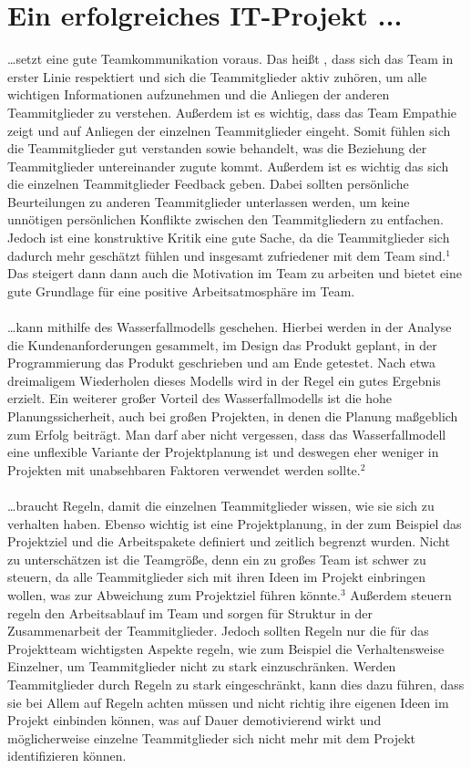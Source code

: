 \documentclass[12pt]{scrartcl}
\begin{document}
\section*{Ein erfolgreiches IT-Projekt ...}
\onehalfspacing
…setzt eine gute Teamkommunikation  voraus. Das heißt , dass sich das Team in erster Linie respektiert und sich die Teammitglieder aktiv zuhören, um alle wichtigen Informationen aufzunehmen und die Anliegen der anderen Teammitglieder zu verstehen. Außerdem ist es wichtig, dass das Team Empathie zeigt und auf Anliegen der einzelnen Teammitglieder eingeht. Somit fühlen sich die Teammitglieder gut verstanden sowie behandelt, was die Beziehung der Teammitglieder untereinander zugute kommt. Außerdem ist es wichtig das sich die einzelnen Teammitglieder Feedback geben. Dabei sollten persönliche Beurteilungen zu anderen Teammitglieder unterlassen werden, um keine unnötigen persönlichen Konflikte zwischen den Teammitgliedern zu entfachen. Jedoch ist eine konstruktive Kritik eine gute Sache, da die Teammitglieder sich dadurch mehr geschätzt fühlen und insgesamt zufriedener mit dem Team sind.$^1$ Das steigert dann dann auch die Motivation im Team zu arbeiten und bietet eine gute Grundlage für eine positive Arbeitsatmosphäre im Team.
	\\ \\
	…kann mithilfe des Wasserfallmodells geschehen. Hierbei werden in der Analyse die Kundenanforderungen gesammelt, im Design das Produkt geplant, in der Programmierung das Produkt geschrieben und am Ende getestet. Nach etwa dreimaligem Wiederholen dieses Modells wird in der Regel ein gutes Ergebnis erzielt. Ein weiterer großer Vorteil des Wasserfallmodells ist die hohe Planungssicherheit, auch bei großen Projekten, in denen die Planung maßgeblich zum Erfolg beiträgt. Man darf aber nicht vergessen, dass das Wasserfallmodell eine unflexible Variante der Projektplanung ist und deswegen eher weniger in Projekten mit unabsehbaren Faktoren verwendet werden sollte.$^2$
	\\ \\
	…braucht Regeln, damit die einzelnen Teammitglieder wissen, wie sie sich zu verhalten haben. Ebenso wichtig ist eine Projektplanung, in der zum Beispiel das Projektziel und die Arbeitspakete definiert und zeitlich begrenzt wurden. Nicht zu unterschätzen ist die Teamgröße, denn ein zu großes Team ist schwer zu steuern, da alle Teammitglieder sich mit ihren Ideen im Projekt einbringen wollen, was zur Abweichung zum Projektziel führen könnte.$^3$ Außerdem steuern regeln den Arbeitsablauf im Team und sorgen für Struktur in der Zusammenarbeit der Teammitglieder. Jedoch sollten Regeln nur die für das Projektteam wichtigsten Aspekte regeln, wie zum Beispiel die Verhaltensweise Einzelner, um Teammitglieder nicht zu stark einzuschränken. Werden Teammitglieder durch Regeln zu stark eingeschränkt, kann dies dazu führen, dass sie bei Allem auf Regeln achten müssen und nicht richtig ihre eigenen Ideen im Projekt einbinden können, was auf Dauer demotivierend wirkt und möglicherweise einzelne Teammitglieder sich nicht mehr mit dem Projekt identifizieren können.
\end{document}
